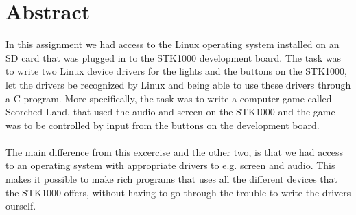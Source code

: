 \section*{Abstract}
In this assignment we had access to the Linux 
operating system installed on an SD card that was 
plugged in to the STK1000 development board. The task
was to write two Linux device drivers for the lights and 
the buttons on the STK1000, let the drivers be recognized 
by Linux and being able to use these drivers through a 
C-program. More specifically, the task was to write a 
computer game called Scorched Land,
that used the audio and screen on the STK1000
and the game was to be controlled by input from the 
buttons on the development board.\\
\\
The main difference from this excercise and the 
other two, is that we had
access to an operating system with appropriate 
drivers to e.g. screen and audio. This makes it possible
to make rich programs that uses all the different devices
that the STK1000 offers, without having to go through
the trouble to write the drivers ourself.
